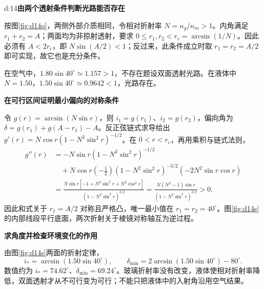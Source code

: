 \begin{drillsolution}{d:14}\textbf{由两个透射条件判断光路能否存在}\par\nobreak
按图\ref{fig:d14q}，两侧外部介质相同，令相对折射率 $N=n_g/n_m>1$。内角满足 $r_1+r_2=A$；两面均为非掠射透射，要求 $0\le r_1,r_2<r_c=\arcsin(1/N)$。因此必须有 $A<2r_c$，即 $N\sin(A/2)<1$；反过来，此条件成立时取 $r_1=r_2=A/2$ 即可实现，故它也是充分条件。

在空气中，$1.80\sin40^\circ\simeq1.157>1$，不存在题设双面透射光路。在液体中 $N=1.50$，$1.50\sin40^\circ\simeq0.9642<1$，光路存在。

\par\medskip{}\noindent\textbf{在可行区间证明最小偏向的对称条件}\par\nobreak
令 $g(r)=\arcsin(N\sin r)$，则 $i_1=g(r_1)$、$i_2=g(r_2)$，偏向角为 $\delta=g(r_1)+g(A-r_1)-A$。反正弦链式求导给出 $g'(r)=N\cos r(1-N^2\sin^2r)^{-1/2}$。在 $0<r<r_c$，再用乘积与链式法则，
\begin{align*}
g''(r)&=-N\sin r(1-N^2\sin^2r)^{-1/2}\\
&\quad+N\cos r\left(-\frac12\right)(1-N^2\sin^2r)^{-3/2}(-2N^2\sin r\cos r)\\
&=\frac{N\sin r[-1+N^2\sin^2r+N^2\cos^2r]}{(1-N^2\sin^2r)^{3/2}}
 =\frac{N(N^2-1)\sin r}{(1-N^2\sin^2r)^{3/2}}>0.
\end{align*}
因此和式关于 $r_1=A/2$ 对称且严格凸，唯一最小值在 $r_1=r_2=40^\circ$。图\ref{fig:d14s}的内部线段平行底面，两次折射关于棱镜对称轴互为逆过程。

\par\medskip{}\noindent\textbf{求角度并检查环境变化的作用}\par\nobreak
由图\ref{fig:d14s}两面的折射定律，
\[
i_*=\arcsin(1.50\sin40^\circ),\qquad
\boxed{\delta_{\min}=2\arcsin(1.50\sin40^\circ)-80^\circ}.
\]
数值约为 $i_*=74.62^\circ$、$\delta_{\min}=69.24^\circ$。玻璃折射率没有改变，液体使相对折射率降低，双面透射才从不可行变为可行；不能只把液体中的入射角沿用空气结果。
\end{drillsolution}


